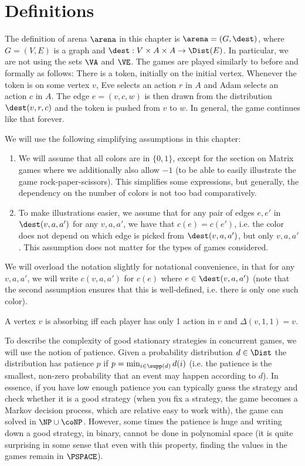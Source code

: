 \section{Definitions}
The definition of arena $\arena$ in this chapter is $\arena=(G,\dest)$, where $G=(V,E)$ is a graph and $\dest:V\times A\times A\rightarrow \Dist(E)$. In particular, we are not using the sets $\VA$ and $\VE$.
The games are played similarly to before and formally as follows: 
There is a token, initially on the initial vertex. 
Whenever the token is on some vertex $v$, 
Eve selects an action $r$ in $A$ and Adam selects an action $c$ in $A$. The edge $e=(v,c,w)$ is then drawn from the distribution $\dest(v,r,c)$ and the token is pushed from $v$ to $w$.
 In general, the game continues like that forever.

We will use the following simplifying assumptions in this chapter:
\begin{enumerate}
\item We will assume that all colors are in $\{0,1\}$, except for the section on Matrix games where we additionally also allow $-1$ (to be able to easily illustrate the game rock-paper-scissors). This simplifies some expressions, but generally, the dependency on the number of colors is not too bad comparatively.
\item To make illustrations easier, we assume that for any pair of edges $e,e'$ in $\dest(v,a,a')$ for any $v,a,a'$, we have that $c(e)=c(e')$, i.e. the color does not depend on which edge is picked from $\dest(v,a,a')$, but only $v,a,a'$. This assumption does not matter for the types of games considered.
\end{enumerate}

We will overload the notation slightly for notational convenience, in that for any $v,a,a'$, we will write $c(v,a,a')$ for $c(e)$ where $e\in \dest(v,a,a')$ (note that the second assumption ensures that this is well-defined, i.e. there is only one such color).


A vertex $v$ is absorbing iff each player has only 1 action in $v$ and $\Delta(v,1,1)=v$.

To describe the complexity of good stationary strategies in concurrent games, we will use the notion of patience. Given a probability distribution $d\in \Dist$ the distribution has patience $p$ if $p=\min_{i\in \supp(d)} d(i)$ (i.e. the patience is the smallest, non-zero probability that an event may happen according to $d$).
In essence, if you have low enough patience you can typically guess the strategy and check whether it is a good strategy (when you fix a strategy, the game becomes a Markov decision process, which are relative easy to work with), the game can solved in $\NP\cup \coNP$. However, some times the patience is huge and writing down a good strategy, in binary, cannot be done in polynomial space (it is quite surprising in some sense that even with this property, finding the values in the games remain in $\PSPACE$).

